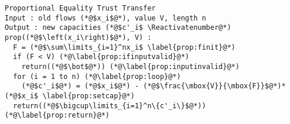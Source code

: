 {}
\Suppressnumber
\begin{lstlisting}[label=prop, style=numbers]
Proportional Equality Trust Transfer
Input : old flows (*@$x_i$@*), value V, length n
Output : new capacities (*@$c'_i$ \Reactivatenumber@*)
prop((*@$\left(x_i\right)$@*), V) :
  F = (*@$\sum\limits_{i=1}^nx_i$ \label{prop:finit}@*)
  if (F < V) (*@\label{prop:ifinputvalid}@*)
    return((*@$\bot$@*)) (*@\label{prop:inputinvalid}@*)
  for (i = 1 to n) (*@\label{prop:loop}@*)
    (*@$c'_i$@*) = (*@$x_i$@*) - (*@$\frac{\mbox{V}}{\mbox{F}}$@*)*(*@$x_i$ \label{prop:setcap}@*)
  return((*@$\bigcup\limits_{i=1}^n\{c'_i\}$@*)) (*@\label{prop:return}@*)
\end{lstlisting}
